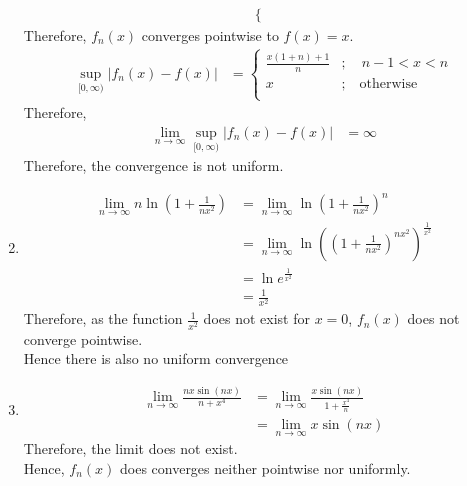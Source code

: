 \documentclass[fleqn, a4paper, 12pt, oneside]{amsart}
\theoremstyle{definition}
\theoremstyle{theorem}
\begin{document}
\begin{solution}
\begin{enumerate}[leftmargin = *]
\begin{align*}
\begin{cases}
					\end{cases}
			\end{align*}
			Therefore, $f_n(x)$ converges pointwise to $f(x) = x$.
			\begin{align*}
				\sup\limits_{[0,\infty)} |f_n(x) - f(x)| &=
					\begin{cases}
						\frac{x (1 + n) + 1}{n} &;\quad n - 1 < x < n\\
						x &;\quad \text{otherwise}\\
					\end{cases}
			\end{align*}
			Therefore,
			\begin{align*}
				\lim\limits_{n \to \infty} \sup\limits_{[0,\infty)} |f_n(x) - f(x)| &= \infty
			\end{align*}
			Therefore, the convergence is not uniform.
		\item
			\begin{align*}
				\lim\limits_{n \to \infty} n \ln \left( 1 + \frac{1}{n x^2} \right) &= \lim\limits_{n \to \infty} \ln \left( 1 + \frac{1}{n x^2} \right)^n\\
				&= \lim\limits_{n \to \infty} \ln \left( \left( 1 + \frac{1}{n x^2} \right)^{n x^2} \right)^{\frac{1}{x^2}}\\
				&= \ln e^{\frac{1}{x^2}}\\
				&= \frac{1}{x^2}
			\end{align*}
			Therefore, as the function $\frac{1}{x^2}$ does not exist for $x = 0$, $f_n(x)$ does not converge pointwise.\\
			Hence there is also no uniform convergence
		\item
			\begin{align*}
				\lim\limits_{n \to \infty} \frac{n x \sin(n x)}{n + x^4} &= \lim\limits_{n \to \infty} \frac{x \sin(n x)}{1 + \frac{x^4}{n}}\\
				&= \lim\limits_{n \to \infty} x \sin(n x)
			\end{align*}
			Therefore, the limit does not exist.\\
			Hence, $f_n(x)$ does converges neither pointwise nor uniformly.
	\end{enumerate}
\end{solution}
\end{document}
